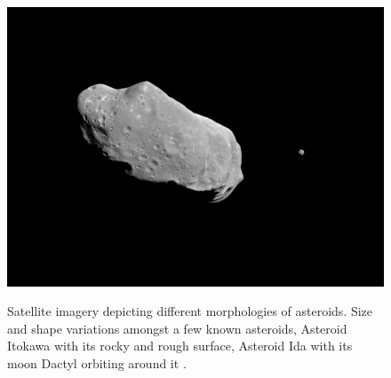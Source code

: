 \begin{figure}[htb]
\begin{minipage}{0.48\columnwidth}
{            \includegraphics[width=\columnwidth, height=0.25\textheight, keepaspectratio=true]{Ida_Dactyl.jpg}
            \label{fig:ida_dactyl_image}
        }
    \end{minipage}
\caption{Satellite imagery depicting different morphologies of asteroids. \protect{} Size and shape variations amongst a few known asteroids, \protect{} Asteroid Itokawa with its rocky and rough surface, \protect{} Asteroid Ida with its moon Dactyl orbiting around it \parencite{nasa_asteroids_web}.}
\label{fig:asteroid_shapes}
\end{figure}
\FloatBarrier
